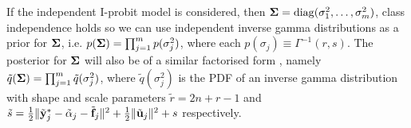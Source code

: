 
If the independent I-probit model is considered, then ${\bm\Sigma} = \operatorname{diag}(\sigma_1^2,\dots,\sigma_m^2)$, class independence holds so we can use independent inverse gamma distributions as a prior for ${\bm\Sigma}$, i.e. $ p({\bm\Sigma}) = \prod_{j=1}^m  p(\sigma_j^2)$, where each $p(\sigma_j) \equiv \Gamma^{-1}(r,s)$.
The posterior for ${\bm\Sigma}$ will also be of a similar factorised form , namely $\tilde q({\bm\Sigma}) = \prod_{j=1}^m \tilde q(\sigma_j^2)$, where $\tilde q(\sigma_j^2)$ is the PDF of an inverse gamma distribution with shape and scale parameters $\tilde r = 2n+r-1$ and $\tilde s = \frac{1}{2}\Vert \tilde{{\mathbf y}}^*_j - \tilde\alpha_j - \tilde{{\mathbf f}}_j \Vert^2 + \frac{1}{2} \Vert \tilde{{\mathbf u}}_j \Vert^2 + s$ respectively.

